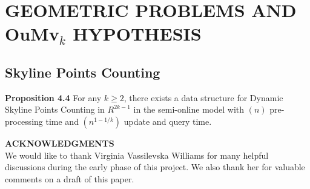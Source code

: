 \documentclass[preprint,10pt]{elsarticle}
\begin{document}
\begin{multicols}{2}
\begin{enumerate}
    
\end{enumerate}

\section{GEOMETRIC PROBLEMS AND OuMv$_k$
HYPOTHESIS}
\subsection{Skyline Points Counting}
\textbf{Proposition 4.4}\label{4.4} For any $k \ge 2$, there exists a data structure for Dynamic Skyline Points Counting in $R^{2k-1}$  in the semi-online model with $(n)$ pre-processing time and $(n^{1-1/k})$ update and query time. 

\textbf{ACKNOWLEDGMENTS}\\
We would like to thank Virginia Vassilevska Williams for many
helpful discussions during the early phase of this project. We also
thank her for valuable comments on a draft of this paper.

\printbibliography

    
\end{multicols}
\end{document}
